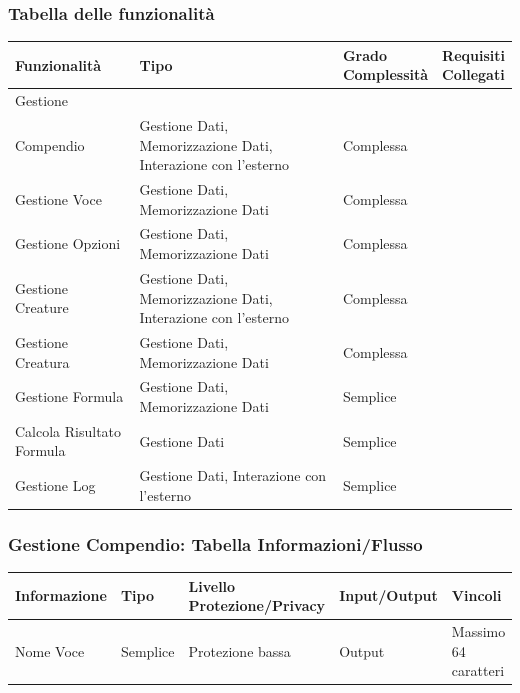 \documentclass[a4paper, 11pt]{article}
\let\newline\\
\begin{document}
\subsubsection*{Tabella delle funzionalità}
\begin{center}
    \begin{tabular}{|p{3cm}|p{3cm}|p{3cm}|p{3cm}|}
        \hline
        \textbf{Funzionalità} & \textbf{Tipo} & \textbf{Grado \newline Complessità} & \textbf{Requisiti \newline Collegati} \\
        \hline
        Gestione \newline Compendio & Gestione Dati, Memorizzazione Dati, Interazione con l’esterno & Complessa & \\
        \hline
        Gestione Voce & Gestione Dati, Memorizzazione Dati & Complessa & \\
        \hline
        Gestione Opzioni & Gestione Dati, Memorizzazione Dati & Complessa & \\
        \hline 
        Gestione Creature & Gestione Dati, Memorizzazione Dati, Interazione con l’esterno & Complessa & \\
        \hline
        Gestione Creatura & Gestione Dati, Memorizzazione Dati & Complessa & \\
        \hline
        Gestione Formula & Gestione Dati, Memorizzazione Dati & Semplice & \\
        \hline
        Calcola Risultato Formula & Gestione Dati & Semplice & \\
        \hline
        Gestione Log & Gestione Dati, Interazione con l'esterno & Semplice & \\\hline
    \end{tabular}
\end{center}

\vspace{2em}

\setlength{\tabcolsep}{10pt}
\subsubsection*{Gestione Compendio: Tabella Informazioni/Flusso}
\begin{adjustwidth}{-1.5cm}{-1.5cm}
\begin{center}
    \begin{tabular}{|p{3cm}|p{1.5cm}|p{3.5cm}|p{2.5cm}|p{4cm}|}
        \hline
        \textbf{Informazione} & \textbf{Tipo} & \textbf{Livello \newline Protezione/Privacy} & \textbf{Input/Output}&\textbf{Vincoli}\\
        \hline
        Nome Voce & Semplice & Protezione bassa & Output & Massimo 64 caratteri\\\hline
        
    \end{tabular}
\end{center}
\end{adjustwidth}
\end{document}
